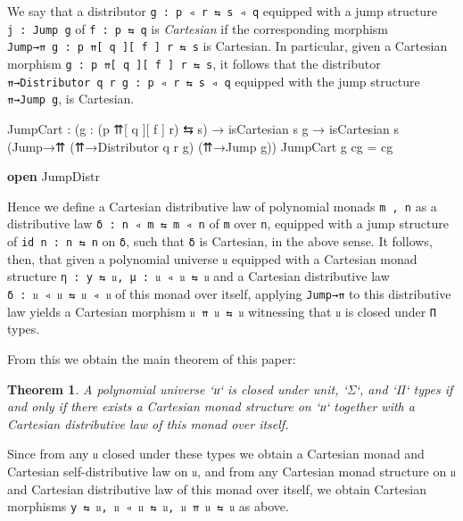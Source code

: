 \documentclass[
  11pt,
  oneside,
  article]{memoir}
\newenvironment{Shaded}{}{}
\newcommand{\KeywordTok}[1]{\textcolor[rgb]{0.00,0.44,0.13}{\textbf{#1}}}
\newcommand{\NormalTok}[1]{#1}
\newcommand{\OtherTok}[1]{\textcolor[rgb]{0.00,0.44,0.13}{#1}}
\theoremstyle{definition}
\theoremstyle{plain}
\newtheorem{theorem}[definitionx]{Theorem}
\newcommand{\0}{\textsf{0}}
\newcommand{\1}{\tn{\textsf{1}}}
\begin{document}
We say that a distributor \texttt{g\ :\ p\ ◃\ r\ ⇆\ s\ ◃\ q} equipped
with a jump structure \texttt{j\ :\ Jump\ g} of \texttt{f\ :\ p\ ⇆\ q}
is \emph{Cartesian} if the corresponding morphism
\texttt{Jump→⇈\ g\ :\ p\ ⇈{[}\ q\ {]}{[}\ f\ {]}\ r\ ⇆\ s} is Cartesian.
In particular, given a Cartesian morphism
\texttt{g\ :\ p\ ⇈{[}\ q\ {]}{[}\ f\ {]}\ r\ ⇆\ s}, it follows that the
distributor \texttt{⇈→Distributor\ q\ r\ g\ :\ p\ ◃\ r\ ⇆\ s\ ◃\ q}
equipped with the jump structure \texttt{⇈→Jump\ g}, is Cartesian.

\begin{Shaded}
\begin{Highlighting}[]
\NormalTok{    JumpCart }\OtherTok{:} \OtherTok{(}\NormalTok{g }\OtherTok{:} \OtherTok{(}\NormalTok{p ⇈[ q ][ f ] r}\OtherTok{)}\NormalTok{ ⇆ s}\OtherTok{)} \OtherTok{→}\NormalTok{ isCartesian s g}
               \OtherTok{→}\NormalTok{ isCartesian s }\OtherTok{(}\NormalTok{Jump→⇈ }\OtherTok{(}\NormalTok{⇈→Distributor q r g}\OtherTok{)} \OtherTok{(}\NormalTok{⇈→Jump g}\OtherTok{))}
\NormalTok{    JumpCart g cg }\OtherTok{=}\NormalTok{ cg}

\KeywordTok{open}\NormalTok{ JumpDistr}
\end{Highlighting}
\end{Shaded}

Hence we define a Cartesian distributive law of polynomial monads
\texttt{m\ ,\ n} as a distributive law
\texttt{δ\ :\ n\ ◃\ m\ ⇆\ m\ ◃\ n} of \texttt{m} over \texttt{n},
equipped with a jump structure of \texttt{id\ n\ :\ n\ ⇆\ n} on
\texttt{δ}, such that \texttt{δ} is Cartesian, in the above sense. It
follows, then, that given a polynomial universe \texttt{𝔲} equipped with
a Cartesian monad structure \texttt{η\ :\ y\ ⇆\ 𝔲,\ μ\ :\ 𝔲\ ◃\ 𝔲\ ⇆\ 𝔲}
and a Cartesian distributive law \texttt{δ\ :\ 𝔲\ ◃\ 𝔲\ ⇆\ 𝔲\ ◃\ 𝔲} of
this monad over itself, applying \texttt{Jump→⇈} to this distributive
law yields a Cartesian morphism \texttt{𝔲\ ⇈\ 𝔲\ ⇆\ 𝔲} witnessing that
\texttt{𝔲} is closed under \texttt{Π} types.

From this we obtain the main theorem of this paper:

\begin{theorem}
A polynomial universe `𝔲` is closed under unit, `Σ`, and `Π` types if and only if there exists a Cartesian monad structure on `𝔲` together with a Cartesian distributive law of this monad over itself.
\end{theorem}

Since from any \texttt{𝔲} closed under these types we obtain a Cartesian
monad and Cartesian self-distributive law on \texttt{𝔲}, and from any
Cartesian monad structure on \texttt{𝔲} and Cartesian distributive law
of this monad over itself, we obtain Cartesian morphisms
\texttt{y\ ⇆\ 𝔲,\ 𝔲\ ◃\ 𝔲\ ⇆\ 𝔲,\ 𝔲\ ⇈\ 𝔲\ ⇆\ 𝔲} as above.
\end{document}
